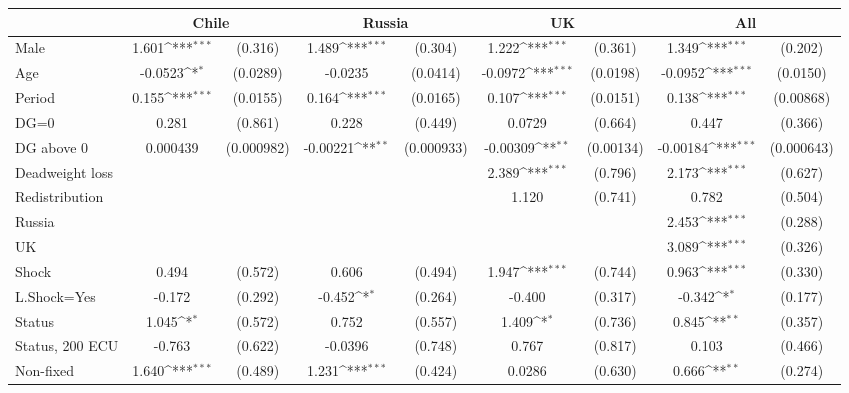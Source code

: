 {
\def\sym#1{\ifmmode^{#1}\else\(^{#1}\)\fi}
\begin{tabular}{l*{4}{cc}}
\hline\hline
                &\multicolumn{2}{c}{Chile}   &\multicolumn{2}{c}{Russia}  &\multicolumn{2}{c}{UK}      &\multicolumn{2}{c}{All}     \\
\hline
Male            &    1.601\sym{***}&  (0.316)&    1.489\sym{***}&  (0.304)&    1.222\sym{***}&  (0.361)&    1.349\sym{***}&  (0.202)\\
Age             &  -0.0523\sym{*}  & (0.0289)&  -0.0235         & (0.0414)&  -0.0972\sym{***}& (0.0198)&  -0.0952\sym{***}& (0.0150)\\
Period          &    0.155\sym{***}& (0.0155)&    0.164\sym{***}& (0.0165)&    0.107\sym{***}& (0.0151)&    0.138\sym{***}&(0.00868)\\
DG=0            &    0.281         &  (0.861)&    0.228         &  (0.449)&   0.0729         &  (0.664)&    0.447         &  (0.366)\\
DG above 0      & 0.000439         &(0.000982)& -0.00221\sym{**} &(0.000933)& -0.00309\sym{**} &(0.00134)& -0.00184\sym{***}&(0.000643)\\
Deadweight loss &                  &         &                  &         &    2.389\sym{***}&  (0.796)&    2.173\sym{***}&  (0.627)\\
Redistribution  &                  &         &                  &         &    1.120         &  (0.741)&    0.782         &  (0.504)\\
Russia          &                  &         &                  &         &                  &         &    2.453\sym{***}&  (0.288)\\
UK              &                  &         &                  &         &                  &         &    3.089\sym{***}&  (0.326)\\
Shock           &    0.494         &  (0.572)&    0.606         &  (0.494)&    1.947\sym{***}&  (0.744)&    0.963\sym{***}&  (0.330)\\
L.Shock=Yes     &   -0.172         &  (0.292)&   -0.452\sym{*}  &  (0.264)&   -0.400         &  (0.317)&   -0.342\sym{*}  &  (0.177)\\
Status          &    1.045\sym{*}  &  (0.572)&    0.752         &  (0.557)&    1.409\sym{*}  &  (0.736)&    0.845\sym{**} &  (0.357)\\
Status, 200 ECU &   -0.763         &  (0.622)&  -0.0396         &  (0.748)&    0.767         &  (0.817)&    0.103         &  (0.466)\\
Non-fixed       &    1.640\sym{***}&  (0.489)&    1.231\sym{***}&  (0.424)&   0.0286         &  (0.630)&    0.666\sym{**} &  (0.274)\\

\end{tabular}}
